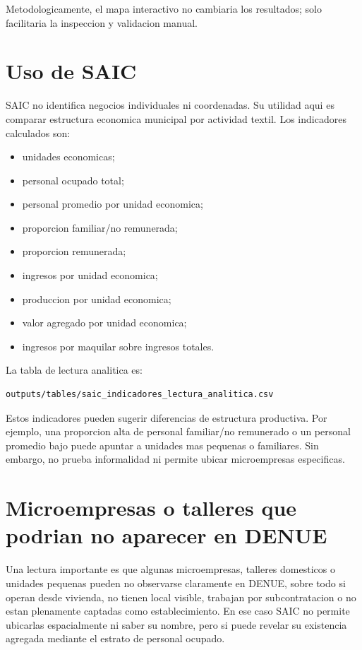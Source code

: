 \documentclass[11pt,letterpaper]{article}
\begin{document}
Metodologicamente, el mapa interactivo no cambiaria los resultados; solo facilitaria la inspeccion y validacion manual.

\section{Uso de SAIC}

SAIC no identifica negocios individuales ni coordenadas. Su utilidad aqui es comparar estructura economica municipal por actividad textil. Los indicadores calculados son:

\begin{itemize}
  \item unidades economicas;
  \item personal ocupado total;
  \item personal promedio por unidad economica;
  \item proporcion familiar/no remunerada;
  \item proporcion remunerada;
  \item ingresos por unidad economica;
  \item produccion por unidad economica;
  \item valor agregado por unidad economica;
  \item ingresos por maquilar sobre ingresos totales.
\end{itemize}

La tabla de lectura analitica es:

\begin{verbatim}
outputs/tables/saic_indicadores_lectura_analitica.csv
\end{verbatim}

Estos indicadores pueden sugerir diferencias de estructura productiva. Por ejemplo, una proporcion alta de personal familiar/no remunerado o un personal promedio bajo puede apuntar a unidades mas pequenas o familiares. Sin embargo, no prueba informalidad ni permite ubicar microempresas especificas.

\section{Microempresas o talleres que podrian no aparecer en DENUE}

Una lectura importante es que algunas microempresas, talleres domesticos o unidades pequenas pueden no observarse claramente en DENUE, sobre todo si operan desde vivienda, no tienen local visible, trabajan por subcontratacion o no estan plenamente captadas como establecimiento. En ese caso SAIC no permite ubicarlas espacialmente ni saber su nombre, pero si puede revelar su existencia agregada mediante el estrato de personal ocupado.
\end{document}
